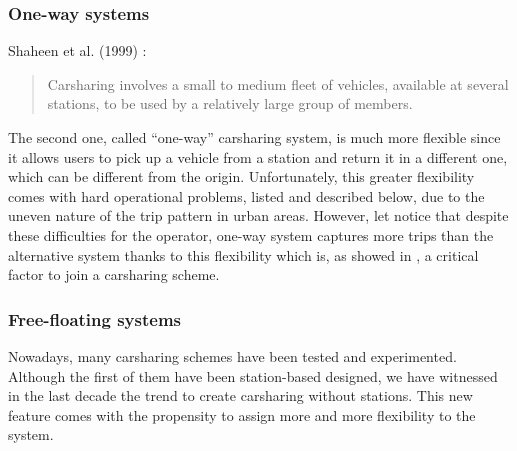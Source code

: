 \begin{bibunit}[ieeetr]
\subsubsection{One-way systems}
Shaheen et al. (1999) \cite{shaheen_short_1999}:
\begin{quote}
Carsharing involves a small to medium fleet of vehicles, available at several stations, to be used by a relatively large group of members.
\end{quote}
The second one, called ``one-way'' carsharing system, is much more flexible since it allows users to pick up a vehicle from a station and return it in a different one, which can be different from the origin.
Unfortunately, this greater flexibility comes with hard operational problems, listed and described below, due to the uneven nature of the trip pattern in urban areas.
However, let notice that despite these difficulties for the operator, one-way system captures more trips than the alternative system thanks to this flexibility which is, as showed in \cite{efthymiou_which_2012}, a critical factor to join a carsharing scheme.


\subsubsection{Free-floating systems}
Nowadays, many carsharing schemes have been tested and experimented.
Although the first of them have been station-based designed, we have witnessed in the last decade the trend to create carsharing without stations.
This new feature comes with the propensity to assign more and more flexibility to the system.




\end{bibunit}
